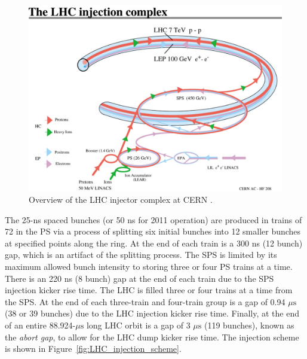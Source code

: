\documentclass[dissertation.tex]{subfiles}
\begin{document}
\begin{figure}
	\centering
	\includegraphics[scale=0.55]{LHC_injector_complex}
	\caption{Overview of the LHC injector complex at CERN \cite{LHC_injector_complex_photo}.}
	\label{fig:LHC_injector_complex}
\end{figure}

The 25-ns spaced bunches (or 50 ns for 2011 operation) are produced in trains of 72 in the PS via a process of splitting six initial bunches into 12 smaller bunches at specified points along the ring.  At the end of each train is a 300 ns (12 bunch) gap, which is an artifact of the splitting process.  The SPS is limited by its maximum allowed bunch intensity to storing three or four PS trains at a time.  There is an 220 ns (8 bunch) gap at the end of each train due to the SPS injection kicker rise time.  The LHC is filled three or four trains at a time from the SPS.  At the end of each three-train and four-train group is a gap of 0.94 $\mu\mbox{s}$ (38 or 39 bunches) due to the LHC injection kicker rise time.  Finally, at the end of an entire 88.924-$\mu\mbox{s}$ long LHC orbit is a gap of 3 $\mu\mbox{s}$ (119 bunches), known as the \textit{abort gap}, to allow for the LHC dump kicker rise time.  The injection scheme is shown in Figure~\ref{fig:LHC_injection_scheme}.
\end{document}
